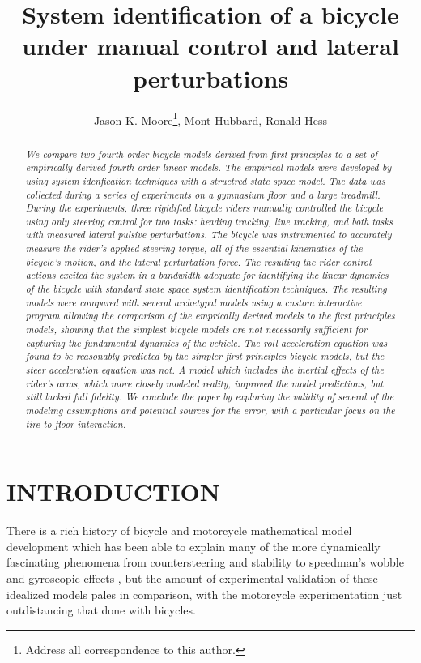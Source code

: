 \documentclass[twocolumn,10pt]{asme2e}
\title{System identification of a bicycle under manual control and lateral
perturbations}
\author{Jason K. Moore\thanks{Address all correspondence to this author.}, {\tensfb Mont Hubbard}, {\tensfb Ronald Hess} \\
    \affiliation{
    Department of Mechanical and Aerospace Engineering\\
    University of California\\
    Davis, California 95616\\
    Email: jkmoor@ucdavis.edu, mhubbard@ucdavis.edu, rahess@ucdavis.edu
    }
}
\begin{document}

\maketitle

\begin{abstract}
	\textit{We compare two fourth order bicycle models derived from first
	principles to a set of empirically derived fourth order linear models. The
	empirical models were developed by using system idenfication techniques with
	a structred state space model. The data was collected during a series of
	experiments on a gymnasium floor and a large treadmill. During the
	experiments, three rigidified bicycle riders manually controlled the bicycle
	using only steering control for two tasks: heading tracking, line tracking,
	and both tasks with measured lateral pulsive perturbations. The bicycle was
	instrumented to accurately measure the rider’s applied steering torque, all
	of the essential kinematics of the bicycle’s motion, and the lateral
	perturbation force. The resulting the rider control actions excited the
	system in a bandwidth adequate for identifying the linear dynamics of the
	bicycle with standard state space system identification techniques. The
	resulting models were compared with several archetypal models using a custom
	interactive program allowing the comparison of the emprically derived models
	to the first principles models, showing that the simplest bicycle models are
	not necessarily sufficient for capturing the fundamental dynamics of the
	vehicle.  The roll acceleration equation was found to be reasonably predicted
	by the simpler first principles bicycle models, but the steer acceleration
	equation was not. A model which includes the inertial effects of the rider’s
	arms, which more closely modeled reality, improved the model predictions, but
	still lacked full fidelity. We conclude the paper by exploring the validity
	of several of the modeling assumptions and potential sources for the error,
	with a particular focus on the tire to floor interaction.}
\end{abstract}
\section*{INTRODUCTION}

There is a rich history of bicycle and motorcycle mathematical model
development which has been able to explain many of the more dynamically
fascinating phenomena from countersteering and stability to speedman's wobble
and gyroscopic effects \cite{Limebeer2006, Meijaard2007, Meijaard2011}, but the
amount of experimental validation of these idealized models pales in
comparison, with the motorcycle experimentation just outdistancing that done with
bicycles.
\end{document}
